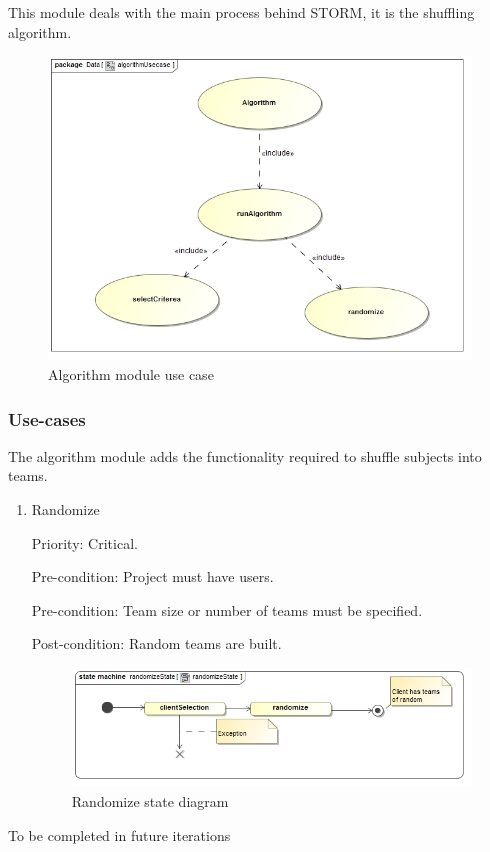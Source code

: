 This module deals with the main process behind STORM, it is the shuffling algorithm.
\begin{figure}[h]
	\centering
	\includegraphics[width=15cm]{./graphics/algorithmUsecase.jpg}
	\caption{Algorithm module use case}
\end{figure}
\subsubsection{Use-cases}

The algorithm module adds the functionality required to shuffle subjects into teams.\par

\begin{enumerate}
\item Randomize\par
Priority: Critical.\par
Pre-condition: Project must have users.\par
Pre-condition: Team size or number of teams must be specified.\par
Post-condition: Random teams are built.\par
    \begin{figure}[h]
        \centering
        \includegraphics[width=15cm]{./graphics/randomizeState.jpg}
        \caption{Randomize state diagram}
    \end{figure}
\end{enumerate}
To be completed in future iterations
\pagebreak
